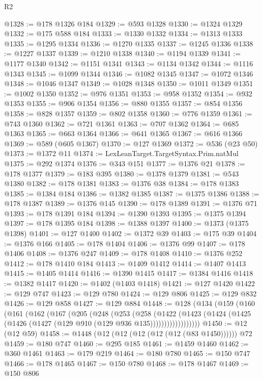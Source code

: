 \begin{lexlean}{R2}
\begin{coremodule}
@1328 := @178 @1326 @184
@1329 := @593 @1328
@1330 := @1324 @1329
@1332 := @175 @588 @184
@1333 := @1330 @1332
@1334 := @1313 @1333
@1335 := @1295 @1334
@1336 := @1270 @1335
@1337 := @1245 @1336
@1338 := @1227 @1337
@1339 := @1210 @1338
@1340 := @1194 @1339
@1341 := @1177 @1340
@1342 := @1151 @1341
@1343 := @1134 @1342
@1344 := @1116 @1343
@1345 := @1099 @1344
@1346 := @1082 @1345
@1347 := @1072 @1346
@1348 := @1046 @1347
@1349 := @1028 @1348
@1350 := @1011 @1349
@1351 := @1002 @1350
@1352 := @976 @1351
@1353 := @958 @1352
@1354 := @932 @1353
@1355 := @906 @1354
@1356 := @880 @1355
@1357 := @854 @1356
@1358 := @828 @1357
@1359 := @802 @1358
@1360 := @776 @1359
@1361 := @743 @1360
@1362 := @721 @1361
@1363 := @707 @1362
@1364 := @685 @1363
@1365 := @663 @1364
@1366 := @641 @1365
@1367 := @616 @1366
@1369 := @589 (@605 @1367)
@1370 := @127 @1369
@1372 := @536 (@23 @50)
@1373 := @1372 @11
@1374 := LexLeanTarget.TargetSyntax.Prim.natMul
@1375 := @292 @1374
@1376 := @343 @151
@1377 := @1376 @21
@1378 := @178 @1377
@1379 := @183 @395
@1380 := @1378 @1379
@1381 := @543 @1380
@1382 := @178 @1381
@1383 := @1376 @38
@1384 := @178 @1383
@1385 := @1384 @184
@1386 := @1382 @1385
@1387 := @1375 @1386
@1388 := @178 @1387
@1389 := @1376 @145
@1390 := @178 @1389
@1391 := @1376 @71
@1393 := @178 @1391 @184
@1394 := @1390 @1393
@1395 := @1375 @1394
@1397 := @178 @1395 @184
@1398 := @1388 @1397
@1400 := @1373 (@1375 @1398)
@1401 := @127 @1400
@1402 := @1372 @39
@1403 := @175 @39
@1404 := @1376 @166
@1405 := @178 @1404
@1406 := @1376 @99
@1407 := @178 @1406
@1408 := @1376 @247
@1409 := @178 @1408
@1410 := @1376 @252
@1412 := @178 @1410 @184
@1413 := @1409 @1412
@1414 := @1407 @1413
@1415 := @1405 @1414
@1416 := @1390 @1415
@1417 := @1384 @1416
@1418 := @1382 @1417
@1420 := @1402 (@1403 @1418)
@1421 := @127 @1420
@1422 := @129 @747
@1423 := @129 @780
@1424 := @129 @806
@1425 := @129 @832
@1426 := @129 @858
@1427 := @129 @884
@1448 := @128
    (@134
      (@159
        (@160
          (@161
            (@162
              (@167
                (@205
                  (@248
                    (@253
                      (@258
                        (@1422
                          (@1423
                            (@1424 (@1425 (@1426 (@1427 (@129 @910 (@129 @936 @135))))))))))))))))))
@1450 := @12 (@12 @59)
@1458 := @1448 (@12 (@12 (@12 (@12 (@12 (@83 @1450)))))) @72
@1459 := @180 @747
@1460 := @295 @185
@1461 := @1459 @1460
@1462 := @360 @1461
@1463 := @179 @219
@1464 := @180 @780
@1465 := @150 @747
@1466 := @178 @1465
@1467 := @150 @780
@1468 := @178 @1467
@1469 := @150 @806

\end{coremodule}
\end{lexlean}
